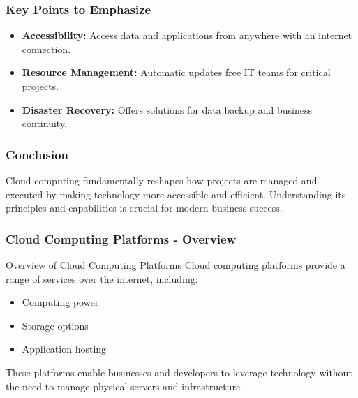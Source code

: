 \documentclass[aspectratio=169]{beamer}
\begin{document}
\begin{frame}[fragile]
    \frametitle{Key Points to Emphasize}
    \begin{itemize}
        \item \textbf{Accessibility:} Access data and applications from anywhere with an internet connection.
        \item \textbf{Resource Management:} Automatic updates free IT teams for critical projects.
        \item \textbf{Disaster Recovery:} Offers solutions for data backup and business continuity.
    \end{itemize}
\end{frame}

\begin{frame}[fragile]
    \frametitle{Conclusion}
    Cloud computing fundamentally reshapes how projects are managed and executed by making technology more accessible and efficient. Understanding its principles and capabilities is crucial for modern business success.
\end{frame}

\begin{frame}[fragile]
    \frametitle{Cloud Computing Platforms - Overview}
    \begin{block}{Overview of Cloud Computing Platforms}
        Cloud computing platforms provide a range of services over the internet, including:
        \begin{itemize}
            \item Computing power
            \item Storage options
            \item Application hosting
        \end{itemize}
        These platforms enable businesses and developers to leverage technology without the need to manage physical servers and infrastructure.
    \end{block}
\end{frame}
\end{document}
